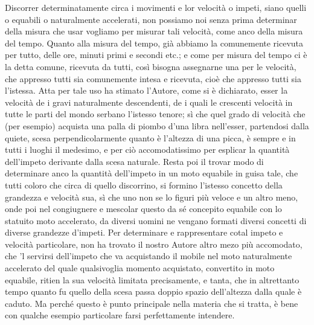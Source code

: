 \documentclass[11pt,twoside,openany]{book}
\begin{document}
Discorrer determinatamente circa i movimenti e lor velocità o impeti, siano quelli o equabili o naturalmente accelerati, non possiamo noi senza prima determinar della misura che usar vogliamo per misurar tali velocità, come anco della misura del tempo. Quanto alla misura del tempo, già abbiamo la comunemente ricevuta per tutto, delle ore, minuti primi e secondi etc.; e come per misura del tempo ci è la detta comune, ricevuta da tutti, così bisogna assegnarne una per le velocità, che appresso tutti sia comunemente intesa e ricevuta, cioè che appresso tutti sia l'istessa. Atta per tale uso ha stimato l'Autore, come si è dichiarato, esser la velocità de i gravi naturalmente descendenti, de i quali le crescenti velocità in tutte le parti del mondo serbano l'istesso tenore; sì che quel grado di velocità che (per esempio) acquista una palla di piombo d'una libra nell'esser, partendosi dalla quiete, scesa perpendicolarmente quanto è l'altezza di una picca, è sempre e in tutti i luoghi il medesimo, e per ciò accomodatissimo per esplicar la quantità dell'impeto derivante dalla scesa naturale. Resta poi il trovar modo di determinare anco la quantità dell'impeto in un moto equabile in guisa tale, che tutti coloro che circa di quello discorrino, si formino l'istesso concetto della grandezza e velocità sua, sì che uno non se lo figuri più veloce e un altro meno, onde poi nel congiugnere e mescolar questo da sé concepito equabile con lo statuito moto accelerato, da diversi uomini ne vengano formati diversi concetti di diverse grandezze d'impeti. Per determinare e rappresentare cotal impeto e velocità particolare, non ha trovato il nostro Autore altro mezo più accomodato, che 'l servirsi dell'impeto che va acquistando il mobile nel moto naturalmente accelerato del quale qualsivoglia momento acquistato, convertito in moto equabile, ritien la sua velocità limitata precisamente, e tanta, che in altrettanto tempo quanto fu quello della scesa passa doppio spazio dell'altezza dalla quale è caduto. Ma perché questo è punto principale nella materia che si tratta, è bene con qualche esempio particolare farsi perfettamente intendere.
\end{document}
